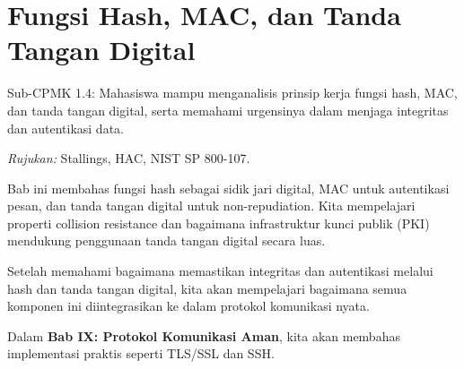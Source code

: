 \documentclass[main.tex]{subfiles}
\begin{document}
\chapter{Fungsi Hash, MAC, dan Tanda Tangan Digital}

\begin{subcpmk}
  \item Sub-CPMK 1.4: Mahasiswa mampu menganalisis prinsip kerja fungsi hash, MAC, dan tanda tangan digital, serta memahami urgensinya dalam menjaga integritas dan autentikasi data.
\end{subcpmk}

\noindent\textit{Rujukan:} Stallings, HAC, NIST SP 800-107.









\begin{rangkuman}
Bab ini membahas fungsi hash sebagai sidik jari digital, MAC untuk autentikasi pesan, dan tanda tangan digital untuk non-repudiation. Kita mempelajari properti collision resistance dan bagaimana infrastruktur kunci publik (PKI) mendukung penggunaan tanda tangan digital secara luas.
\end{rangkuman}


\begin{transition}
Setelah memahami bagaimana memastikan integritas dan autentikasi melalui hash dan tanda tangan digital, kita akan mempelajari bagaimana semua komponen ini diintegrasikan ke dalam protokol komunikasi nyata.

Dalam \textbf{Bab IX: Protokol Komunikasi Aman}, kita akan membahas implementasi praktis seperti TLS/SSL dan SSH.
\end{transition}

\ifSubfilesClassLoaded{
  \renewcommand{\bibname}{Daftar Pustaka}
  
  
}{}
\end{document}

